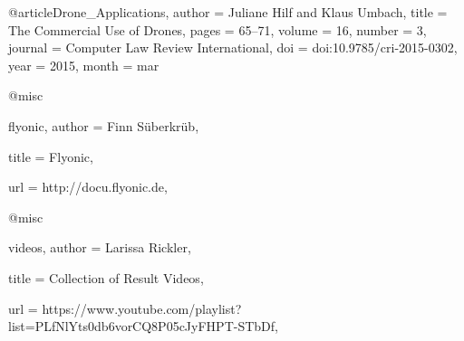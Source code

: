 @article{Drone_Applications,
        author = {Juliane Hilf and Klaus Umbach},
        title = {The Commercial Use of Drones},
        pages = {65--71},
        volume = {16},
        number = {3},
        journal = {Computer Law Review International},
        doi = {doi:10.9785/cri-2015-0302},
        year = {2015},
        month = mar
}

@misc{flyonic,
        author = {Finn Süberkrüb},
        
        title = {Flyonic},
        
        url = {http://docu.flyonic.de},
}

@misc{videos,
        author = {Larissa Rickler},
        
        title = {Collection of Result Videos},
        
        url = {https://www.youtube.com/playlist?list=PLfNlYts0db6vorCQ8P05cJyFHPT-STbDf},
}



